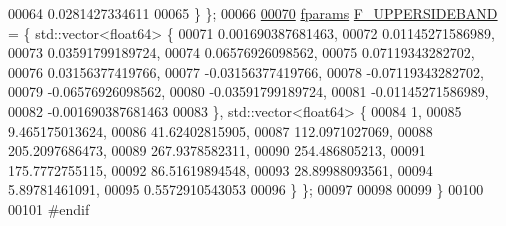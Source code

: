 \begin{DoxyCode}
00064             0.0281427334611
00065     \} \};
00066 
\hypertarget{fvectors_8hpp_source_l00070}{}\hyperlink{namespaceradio_a0ec4548711b6d6ed6867c70b3fc2a413}{00070}     \hyperlink{definitions_8hpp_a7615684c2af56be5f302c5b367d71f6b}{fparams} \hyperlink{namespaceradio_a0ec4548711b6d6ed6867c70b3fc2a413}{F\_UPPERSIDEBAND} = \{ std::vector<float64> \{
00071         0.001690387681463, 
00072             0.01145271586989, 
00073             0.03591799189724, 
00074             0.06576926098562,
00075             0.07119343282702,
00076             0.03156377419766,
00077             -0.03156377419766,
00078             -0.07119343282702,
00079             -0.06576926098562,
00080             -0.03591799189724,
00081             -0.01145271586989,
00082             -0.001690387681463
00083     \}, std::vector<float64> \{
00084         1,  
00085             9.465175013624,
00086             41.62402815905,
00087             112.0971027069,
00088             205.2097686473,    
00089             267.9378582311,     
00090             254.486805213,
00091             175.7772755115,
00092             86.51619894548,   
00093             28.89988093561,     
00094             5.89781461091,
00095             0.5572910543053   
00096     \} \};
00097 
00098 
00099 \}
00100 
00101 \textcolor{preprocessor}{#endif}
\end{DoxyCode}
